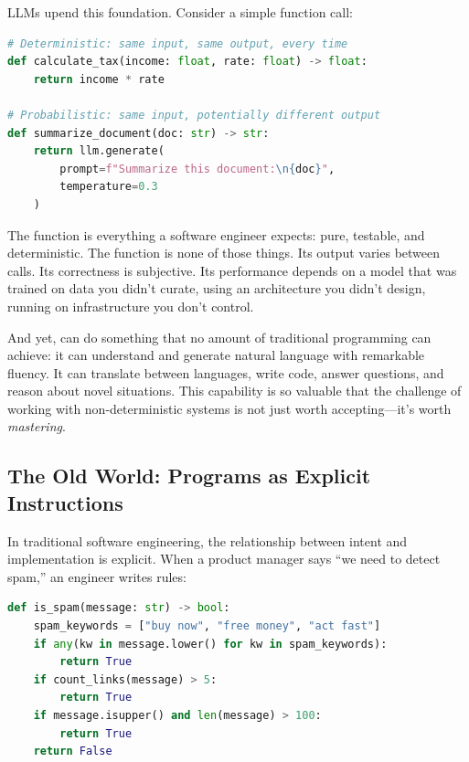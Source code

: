 LLMs upend this foundation. Consider a simple function call:

\begin{lstlisting}[language=Python, caption={A traditional function vs. an LLM call}]
# Deterministic: same input, same output, every time
def calculate_tax(income: float, rate: float) -> float:
    return income * rate

# Probabilistic: same input, potentially different output
def summarize_document(doc: str) -> str:
    return llm.generate(
        prompt=f"Summarize this document:\n{doc}",
        temperature=0.3
    )
\end{lstlisting}

The  function is everything a software engineer expects: pure, testable, and deterministic. The  function is none of those things. Its output varies between calls. Its correctness is subjective. Its performance depends on a model that was trained on data you didn't curate, using an architecture you didn't design, running on infrastructure you don't control.

And yet,  can do something that no amount of traditional programming can achieve: it can understand and generate natural language with remarkable fluency. It can translate between languages, write code, answer questions, and reason about novel situations. This capability is so valuable that the challenge of working with non-deterministic systems is not just worth accepting---it's worth \emph{mastering}.

\subsection{The Old World: Programs as Explicit Instructions}

In traditional software engineering, the relationship between intent and implementation is explicit. When a product manager says ``we need to detect spam,'' an engineer writes rules:

\begin{lstlisting}[language=Python, caption={Traditional rule-based spam detection}]
def is_spam(message: str) -> bool:
    spam_keywords = ["buy now", "free money", "act fast"]
    if any(kw in message.lower() for kw in spam_keywords):
        return True
    if count_links(message) > 5:
        return True
    if message.isupper() and len(message) > 100:
        return True
    return False
\end{lstlisting}

